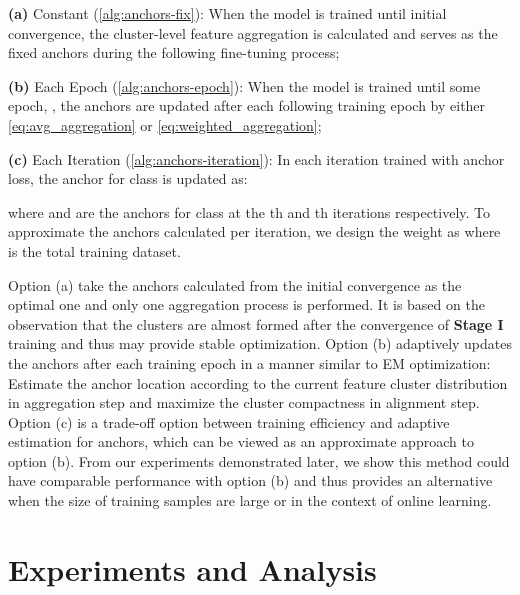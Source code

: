 \documentclass[runningheads]{llncs}
\begin{document}
 \textbf{(a)} Constant (\cref{alg:anchors-fix}): When the model is trained until initial convergence, the cluster-level feature aggregation is calculated and serves as the fixed anchors during the following fine-tuning process;

 \textbf{(b)} Each Epoch (\cref{alg:anchors-epoch}): When the model is trained until some epoch, , the anchors  are updated after each following training epoch by either \cref{eq:avg_aggregation} or \cref{eq:weighted_aggregation};

 \textbf{(c)} Each Iteration (\cref{alg:anchors-iteration}): In each iteration trained with anchor loss, the anchor for class  is updated as:

where  and  are  the anchors for class  at the th and th iterations respectively.  
To approximate the anchors calculated per iteration, we design the weight as  where  is the total training dataset.

Option (a) take the anchors calculated from the initial convergence as the optimal one and only one aggregation process is performed. It is based on the observation that the clusters are almost formed after the convergence of \textbf{Stage I} training and thus may provide stable optimization.
Option (b) adaptively updates the anchors after each training epoch in a manner similar to EM optimization: Estimate the anchor location according to the current feature cluster distribution in aggregation step and maximize the cluster compactness in alignment step.
Option (c) is a trade-off option between training efficiency and adaptive estimation for anchors, which can be viewed as an approximate approach to option (b).
From our experiments demonstrated later, we show this method could have comparable performance with option (b) and thus provides an alternative when the size of training samples are large or in the context of online learning.


\section{Experiments and Analysis}

\vspace*{-0.18cm}
\end{document}
